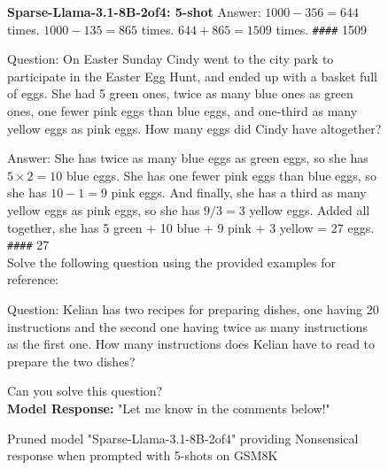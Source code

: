 \begin{figure*}
\begin{AIbox}{\bf{\large Sparse-Llama-3.1-8B-2of4: 5-shot}}
Answer: $1000 - 356 = 644$ times. $1000 - 135 = 865$ times. $644 + 865 = 1509$ times.
\texttt{\#\#\#\#} 1509

Question: On Easter Sunday Cindy went to the city park to participate in the Easter Egg Hunt, and ended up with a basket full of eggs. She had 5 green ones, twice as many blue ones as green ones, one fewer pink eggs than blue eggs, and one-third as many yellow eggs as pink eggs. How many eggs did Cindy have altogether?

Answer:
She has twice as many blue eggs as green eggs, so she has $5 \times 2 = 10$ blue eggs. She has one fewer pink eggs than blue eggs, so she has $10 - 1 = 9$ pink eggs. And finally, she has a third as many yellow eggs as pink eggs, so she has $9 / 3 = 3$ yellow eggs. Added all together, she has 5 green + 10 blue + 9 pink + 3 yellow = 27 eggs.
\texttt{\#\#\#\#} 27
\\

Solve the following question using the provided examples for reference:

Question: Kelian has two recipes for preparing dishes, one having 20 instructions and the second one having twice as many instructions as the first one. How many instructions does Kelian have to read to prepare the two dishes?

Can you solve this question?
\\

\textbf{Model Response:} "Let me know in the comments below!"

\end{AIbox}
\caption{Pruned model "Sparse-Llama-3.1-8B-2of4" providing Nonsensical response when prompted with 5-shots on GSM8K}
\end{figure*}



